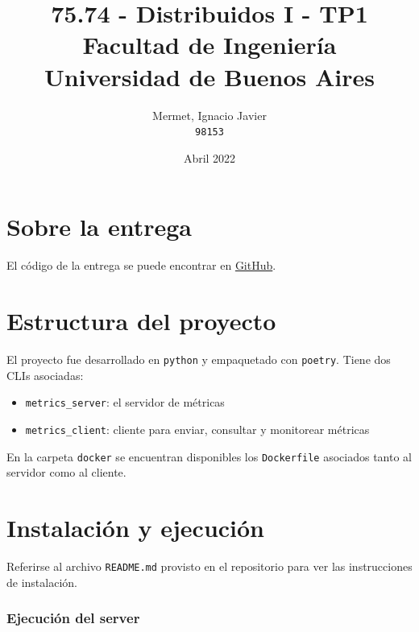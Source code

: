 \documentclass[titlepage,a4paper,oneside]{article}
\begin{document}
\begin{titlepage}
\title{
	75.74 \-- Distribuidos I \-- TP1\\
    \large Facultad de Ingeniería\\
	Universidad de Buenos Aires
}
\author{
	Mermet, Ignacio Javier\\
	\texttt{98153}
}
\date{Abril 2022}

\maketitle

\end{titlepage}

\tableofcontents

\newpage

\section{Sobre la entrega}
El código de la entrega se puede encontrar en \href{https://github.com/CrossNox/7574-TP1}{GitHub}.

\section{Estructura del proyecto}
El proyecto fue desarrollado en \texttt{python}\cite{Python} y empaquetado con \texttt{poetry}\cite{PythonPoetry}. Tiene dos CLIs asociadas:

\begin{itemize}
	\item \texttt{metrics\_server}: el servidor de métricas
	\item \texttt{metrics\_client}: cliente para enviar, consultar y monitorear métricas
\end{itemize}

En la carpeta \texttt{docker} se encuentran disponibles los \texttt{Dockerfile} asociados tanto al servidor como al cliente.

\section{Instalación y ejecución}
Referirse al archivo \texttt{README.md} provisto en el repositorio para ver las instrucciones de instalación.

\subsubsection{Ejecución del server}
\end{document}
